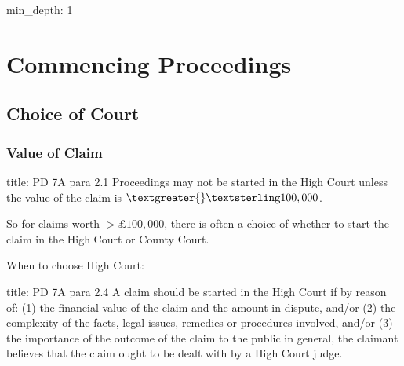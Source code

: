 \documentclass[
]{article}
\author{}
\date{}
\newenvironment{Shaded}{}{}
\newcommand{\NormalTok}[1]{#1}
\begin{document}
{
\setcounter{tocdepth}{3}
\tableofcontents
}
\begin{Shaded}
\begin{Highlighting}[]
\NormalTok{min\_depth: 1}
\end{Highlighting}
\end{Shaded}

\hypertarget{commencing-proceedings}{%
\section{Commencing Proceedings}\label{commencing-proceedings}}

\hypertarget{choice-of-court}{%
\subsection{Choice of Court}\label{choice-of-court}}

\hypertarget{value-of-claim}{%
\subsubsection{Value of Claim}\label{value-of-claim}}

\begin{Shaded}
\begin{Highlighting}[]
\NormalTok{title: PD 7A para 2.1}
\NormalTok{Proceedings may not be started in the High Court unless the value of the claim is $\textgreater{}£100,000$. }
\end{Highlighting}
\end{Shaded}

So for claims worth \(>£100,000\), there is often a choice of whether to
start the claim in the High Court or County Court.

When to choose High Court:

\begin{Shaded}
\begin{Highlighting}[]
\NormalTok{title: PD 7A para 2.4}
\NormalTok{A claim should be started in the High Court if by reason of:}
\NormalTok{(1) the financial value of the claim and the amount in dispute, and/or}
\NormalTok{(2) the complexity of the facts, legal issues, remedies or procedures involved, and/or}
\NormalTok{(3) the importance of the outcome of the claim to the public in general,}
\NormalTok{the claimant believes that the claim ought to be dealt with by a High Court judge.}
\end{Highlighting}
\end{Shaded}
\end{document}
